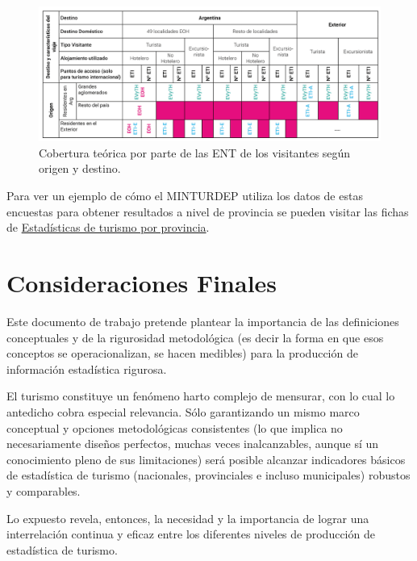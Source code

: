 \documentclass[
  openany]{book}
\begin{document}
\begin{figure}

{\centering \includegraphics[width=1\linewidth]{imagenes/figura2.4} 

}

\caption{Cobertura teórica por parte de las ENT de los visitantes según origen y destino.}\label{fig:coberturaENT}
\end{figure}

Para ver un ejemplo de cómo el MINTURDEP utiliza los datos de estas encuestas para obtener resultados a nivel de provincia se pueden visitar las fichas de \href{https://www.yvera.tur.ar/estadistica/info/estadisticas-de-turismo-por-provincias}{Estadísticas de turismo por provincia}.

\hypertarget{consideraciones-finales}{%
\chapter*{Consideraciones Finales}\label{consideraciones-finales}}

Este documento de trabajo pretende plantear la importancia de las definiciones conceptuales y de la rigurosidad metodológica (es decir la forma en que esos conceptos se operacionalizan, se hacen medibles) para la producción de información estadística rigurosa.

El turismo constituye un fenómeno harto complejo de mensurar, con lo cual lo antedicho cobra especial relevancia.
Sólo garantizando un mismo marco conceptual y opciones metodológicas consistentes (lo que implica no necesariamente diseños perfectos, muchas veces inalcanzables, aunque sí un conocimiento pleno de sus limitaciones) será posible alcanzar indicadores básicos de estadística de turismo (nacionales, provinciales e incluso municipales) robustos y comparables.

Lo expuesto revela, entonces, la necesidad y la importancia de lograr una interrelación continua y eficaz entre los diferentes niveles de producción de estadística de turismo.

  
\end{document}
